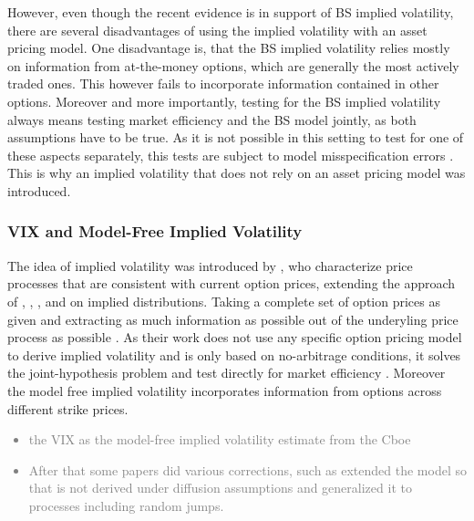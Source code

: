 However, even though the recent evidence is in support of \gls{BS} implied volatility, there are several disadvantages of using the implied volatility with an asset pricing model. One disadvantage is, that the \gls{BS} implied volatility relies mostly on information from at-the-money options, which are generally the most actively traded ones. This however fails to incorporate information contained in other options. Moreover and more importantly, testing for the \gls{BS} implied volatility always means testing market efficiency and the \gls{BS} model jointly, as both assumptions have to be true. As it is not possible in this setting to test for one of these aspects separately, this tests are subject to model misspecification errors \parencite{jiang2005}. This is why an implied volatility that does not rely on an asset pricing model was introduced. 


\subsubsection{VIX and Model-Free Implied Volatility}
The idea of implied volatility was introduced by \textcite{britten2000}, who characterize price processes that are consistent with current option prices, extending the approach of \textcite{derman1994}, \textcite{kani1994}, \textcite{dupire1994}, \textcite{dupire1997} and \textcite{rubinstein1994} on implied distributions. Taking a complete set of option prices as given and extracting as much information as possible out of the underyling price process as possible \parencite{britten2000}. As their work does not use any specific option pricing model to derive implied volatility and is only based on no-arbitrage conditions, it solves the joint-hypothesis problem and test directly for market efficiency \parencite{jiang2005}. Moreover the model free implied volatility incorporates information from options across different strike prices.\\





\textcolor{gray}{
\begin{itemize}\itemsep0pt
\item the VIX as the model-free implied volatility estimate from the Cboe 
\item After that some papers did various corrections, such as \citeauthor{jiang2005} extended the model so that is not derived under diffusion assumptions and generalized it to processes including random jumps. 
\end{itemize}
}
